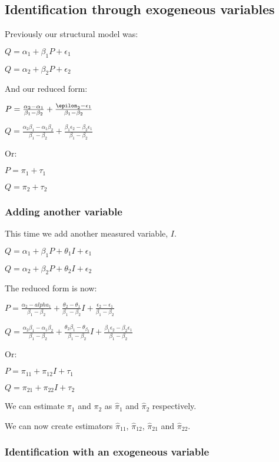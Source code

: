 
\subsection{Identification through exogeneous variables}

Previously our structural model was:

\(Q=\alpha_1 + \beta_1 P + \epsilon_1 \)

\(Q=\alpha_2 + \beta_2 P + \epsilon_2 \)

And our reduced form:

\(P =\frac{\alpha_2-\alpha_1 }{\beta_1-\beta_2}+\frac{\epilon_2-\epsilon_1 }{\beta_1-\beta_2}\)

\(Q =\frac{\alpha_2\beta_1-\alpha_1\beta_2 }{\beta_1-\beta_2}+\frac{\beta_1\epsilon_2 -\beta_2\epsilon_1}{\beta_1-\beta_2}\)

Or:

\(P=\pi_1 + \tau_1 \)

\(Q= \pi_2 + \tau_2\)

\subsubsection{Adding another variable}

This time we add another measured variable, \(I\).

\(Q=\alpha_1 + \beta_1 P + \theta_1 I + \epsilon_1 \)

\(Q=\alpha_2 + \beta_2 P + \theta_2 I + \epsilon_2 \)

The reduced form is now:

\(P =\frac{\alpha_2 -alpha_1 }{\beta_1-\beta_2}+\frac{\theta_2-\theta_1 }{\beta_1-\beta_2}I+\frac{\epsilon_2-\epsilon_1}{\beta_1-\beta_2}\)

\(Q =\frac{\alpha_2\beta_1-\alpha_1\beta_2 }{\beta_1-\beta_2}+\frac{\theta_2\beta_1-\theta_\beta_2}{\beta_1-\beta_2}I+\frac{\beta_1\epsilon_2 -\beta_2\epsilon_1}{\beta_1-\beta_2}\)

Or:

\(P =\pi_{11} +\pi_{12}I + \tau_1 \)

\(Q= \pi_{21} +\pi_{22}I + \tau_2 \)

We can estimate \(\pi_1 \) and \(\pi_2 \) as \(\hat \pi_1\) and \(\hat \pi_2\) respectively.

We can now create estimators \(\hat \pi_{11}\), \(\hat \pi_{12}\), \(\hat \pi_{21}\) and \(\hat \pi_{22}\).

\subsubsection{Identification with an exogeneous variable}


